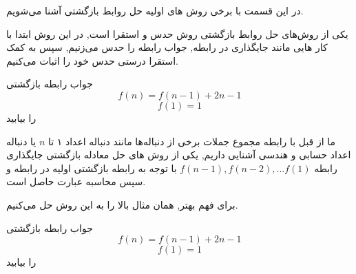 
در این قسمت با برخی روش های اولیه حل روابط بازگشتی آشنا می‌شویم.

یکی از روش‌های حل روابط بازگشتی روش حدس و استقرا است, در این روش ابتدا با کار هایی مانند جایگذاری در رابطه, جواب رابطه را حدس می‌زنیم, سپس به کمک استقرا درستی حدس خود را اثبات می‌کنیم.

\begin{PROBLEM}
    جواب رابطه بازگشتی 
    $$f(n)=f(n-1)+2n-1$$
    $$f(1)=1$$
    را بیابید

 \end{PROBLEM}
 
 ما از قبل با رابطه مجموع جملات برخی از دنباله‌ها مانند دنباله اعداد ۱ تا 
$n$
 یا دنباله اعداد حسابی و هندسی
 آشنایی داریم, یکی از روش های حل معادله بازگشتی جایگذاری رابطه 
 $f(n-1), f(n-2), ...f(1)$
 با توجه به رابطه بازگشتی اولیه در رابطه و سپس محاسبه عبارت حاصل است.

 برای فهم بهتر, همان مثال بالا را به این روش حل می‌کنیم.
 \begin{PROBLEM}
    جواب رابطه بازگشتی 
    $$f(n)=f(n-1)+2n-1$$
    $$f(1)=1$$
    را بیابید

 \end{PROBLEM}
 
